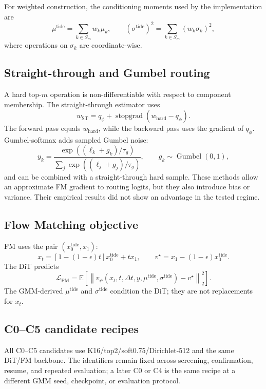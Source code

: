 \documentclass[11pt,a4paper]{article}
\newcommand{\stopgrad}{\operatorname{stopgrad}}
\begin{document}
For weighted construction, the conditioning moments used by the implementation
are
\[
 \mu^{\mathrm{tide}}=\sum_{k\in S_m}w_k\mu_k,\qquad
 (\sigma^{\mathrm{tide}})^2
 =\sum_{k\in S_m}(w_k\sigma_k)^2,
\]
where operations on \(\sigma_k\) are coordinate-wise.

\subsection{Straight-through and Gumbel routing}

A hard top-\(m\) operation is non-differentiable with respect to component
membership. The straight-through estimator uses
\[
 w_{\mathrm{ST}}
 =q_\phi+\stopgrad(w_{\mathrm{hard}}-q_\phi).
\]
The forward pass equals \(w_{\mathrm{hard}}\), while the backward pass uses the
gradient of \(q_\phi\). Gumbel-softmax adds sampled Gumbel noise:
\[
 y_k=
 \frac{\exp((\ell_k+g_k)/\tau_g)}
 {\sum_j\exp((\ell_j+g_j)/\tau_g)},\qquad
 g_k\sim\operatorname{Gumbel}(0,1),
\]
and can be combined with a straight-through hard sample. These methods allow
an approximate FM gradient to routing logits, but they also introduce bias or
variance. Their empirical results did not show an advantage in the tested
regime.

\subsection{Flow Matching objective}

FM uses the pair \((x_0^{\mathrm{tide}},x_1)\):
\[
 x_t=\left[1-(1-\epsilon)t\right]x_0^{\mathrm{tide}}+t x_1,
 \qquad
 v^\star=x_1-(1-\epsilon)x_0^{\mathrm{tide}}.
\]
The DiT predicts
\[
 \mathcal L_{\mathrm{FM}}
 =
 \mathbb E
 \left[
 \left\|
 v_\psi(x_t,t,\Delta t,y,\mu^{\mathrm{tide}},\sigma^{\mathrm{tide}})
 -v^\star
 \right\|_2^2
 \right].
\]
The GMM-derived \(\mu^{\mathrm{tide}}\) and
\(\sigma^{\mathrm{tide}}\) condition the DiT; they are not replacements for
\(x_t\).

\subsection{C0--C5 candidate recipes}

All C0--C5 candidates use K16/top2/soft0.75/Dirichlet-512 and the same DiT/FM
backbone. The identifiers remain fixed across screening, confirmation, resume,
and repeated evaluation; a later C0 or C4 is the same recipe at a different
GMM seed, checkpoint, or evaluation protocol.
\end{document}

